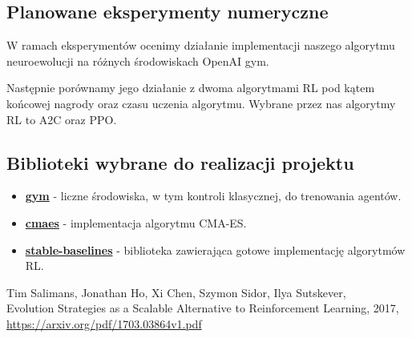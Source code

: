 \documentclass[12pt,a4paper]{article}
\begin{document}
\subsection{Planowane eksperymenty numeryczne}

W ramach eksperymentów ocenimy działanie implementacji naszego algorytmu 
neuroewolucji na różnych środowiskach OpenAI gym.

Następnie porównamy jego działanie z dwoma algorytmami RL pod kątem 
końcowej nagrody oraz czasu uczenia algorytmu. Wybrane przez nas 
algorytmy RL to A2C oraz PPO.


\subsection{Biblioteki wybrane do realizacji projektu}

\begin{itemize}
  \item \textbf{\href{https://github.com/openai/gym}{gym}} - liczne środowiska, w tym kontroli klasycznej, 
  do trenowania agentów.
  \item \textbf{\href{https://github.com/CyberAgentAILab/cmaes}{cmaes}} - 
  implementacja algorytmu CMA-ES.
  \item \textbf{\href{https://github.com/DLR-RM/stable-baselines3}{stable-baselines}} -
  biblioteka zawierająca gotowe implementację algorytmów RL.
\end{itemize}

\begin{thebibliography}{9}
Tim Salimans, Jonathan Ho, Xi Chen, Szymon Sidor, Ilya Sutskever,\\
Evolution Strategies as a Scalable Alternative to Reinforcement Learning,
2017, \href{https://arxiv.org/pdf/1703.03864v1.pdf}{https://arxiv.org/pdf/1703.03864v1.pdf}

\end{thebibliography}
  
\end{document}
